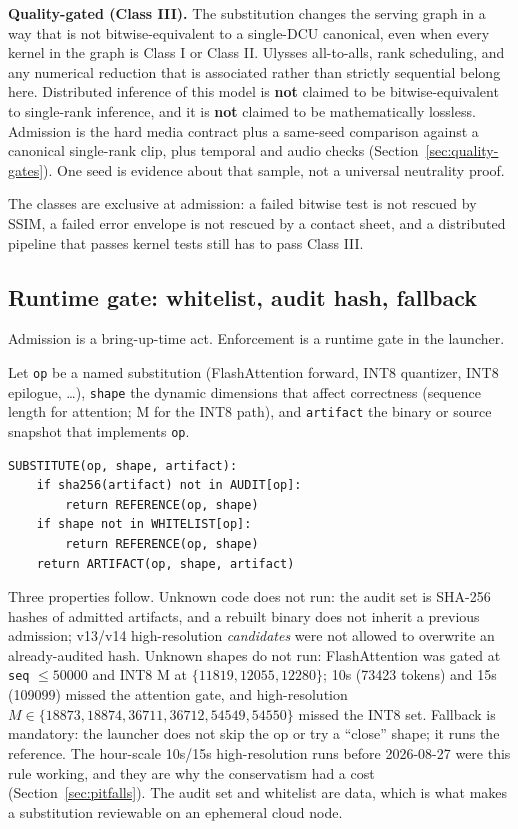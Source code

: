 \documentclass[11pt]{article}
\begin{document}
\textbf{Quality-gated (Class III).} The substitution changes the serving graph in a way that is not bitwise-equivalent to a single-DCU canonical, even when every kernel in the graph is Class I or Class II. Ulysses all-to-alls, rank scheduling, and any numerical reduction that is associated rather than strictly sequential belong here. Distributed inference of this model is \textbf{not} claimed to be bitwise-equivalent to single-rank inference, and it is \textbf{not} claimed to be mathematically lossless. Admission is the hard media contract plus a same-seed comparison against a canonical single-rank clip, plus temporal and audio checks (Section~\ref{sec:quality-gates}). One seed is evidence about that sample, not a universal neutrality proof.

The classes are exclusive at admission: a failed bitwise test is not rescued by SSIM, a failed error envelope is not rescued by a contact sheet, and a distributed pipeline that passes kernel tests still has to pass Class III.

\subsection{Runtime gate: whitelist, audit hash, fallback}
\label{sec:runtime-gate}

Admission is a bring-up-time act. Enforcement is a runtime gate in the launcher.

Let \texttt{op} be a named substitution (FlashAttention forward, INT8 quantizer, INT8 epilogue, \ldots), \texttt{shape} the dynamic dimensions that affect correctness (sequence length for attention; M for the INT8 path), and \texttt{artifact} the binary or source snapshot that implements \texttt{op}.

\begin{verbatim}
SUBSTITUTE(op, shape, artifact):
    if sha256(artifact) not in AUDIT[op]:
        return REFERENCE(op, shape)
    if shape not in WHITELIST[op]:
        return REFERENCE(op, shape)
    return ARTIFACT(op, shape, artifact)
\end{verbatim}

Three properties follow. Unknown code does not run: the audit set is SHA-256 hashes of admitted artifacts, and a rebuilt binary does not inherit a previous admission; v13/v14 high-resolution \emph{candidates} were not allowed to overwrite an already-audited hash. Unknown shapes do not run: FlashAttention was gated at \texttt{seq} $\leq 50000$ and INT8 M at $\{11819, 12055, 12280\}$; 10s (73423 tokens) and 15s (109099) missed the attention gate, and high-resolution $M \in \{18873, 18874, 36711, 36712, 54549, 54550\}$ missed the INT8 set. Fallback is mandatory: the launcher does not skip the op or try a ``close'' shape; it runs the reference. The hour-scale 10s/15s high-resolution runs before 2026-08-27 were this rule working, and they are why the conservatism had a cost (Section~\ref{sec:pitfalls}). The audit set and whitelist are data, which is what makes a substitution reviewable on an ephemeral cloud node.
\end{document}
